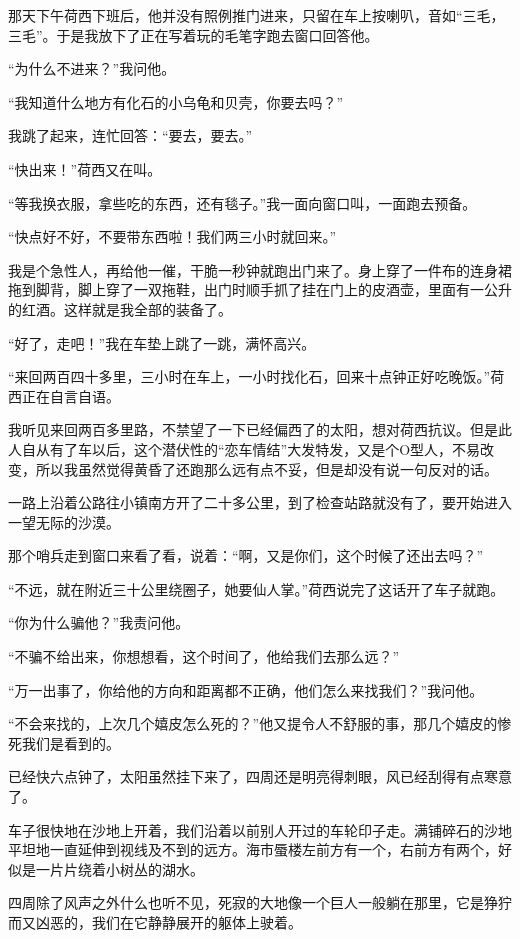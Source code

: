 \par 那天下午荷西下班后，他并没有照例推门进来，只留在车上按喇叭，音如“三毛，三毛”。于是我放下了正在写着玩的毛笔字跑去窗口回答他。
\par “为什么不进来？”我问他。
\par “我知道什么地方有化石的小乌龟和贝壳，你要去吗？”
\par 我跳了起来，连忙回答：“要去，要去。”
\par “快出来！”荷西又在叫。
\par “等我换衣服，拿些吃的东西，还有毯子。”我一面向窗口叫，一面跑去预备。
\par “快点好不好，不要带东西啦！我们两三小时就回来。”
\par 我是个急性人，再给他一催，干脆一秒钟就跑出门来了。身上穿了一件布的连身裙拖到脚背，脚上穿了一双拖鞋，出门时顺手抓了挂在门上的皮酒壶，里面有一公升的红酒。这样就是我全部的装备了。
\par “好了，走吧！”我在车垫上跳了一跳，满怀高兴。
\par “来回两百四十多里，三小时在车上，一小时找化石，回来十点钟正好吃晚饭。”荷西正在自言自语。
\par 我听见来回两百多里路，不禁望了一下已经偏西了的太阳，想对荷西抗议。但是此人自从有了车以后，这个潜伏性的“恋车情结”大发特发，又是个O型人，不易改变，所以我虽然觉得黄昏了还跑那么远有点不妥，但是却没有说一句反对的话。
\par 一路上沿着公路往小镇南方开了二十多公里，到了检查站路就没有了，要开始进入一望无际的沙漠。
\par 那个哨兵走到窗口来看了看，说着：“啊，又是你们，这个时候了还出去吗？”
\par “不远，就在附近三十公里绕圈子，她要仙人掌。”荷西说完了这话开了车子就跑。
\par “你为什么骗他？”我责问他。
\par “不骗不给出来，你想想看，这个时间了，他给我们去那么远？”
\par “万一出事了，你给他的方向和距离都不正确，他们怎么来找我们？”我问他。
\par “不会来找的，上次几个嬉皮怎么死的？”他又提令人不舒服的事，那几个嬉皮的惨死我们是看到的。
\par 已经快六点钟了，太阳虽然挂下来了，四周还是明亮得刺眼，风已经刮得有点寒意了。
\par 车子很快地在沙地上开着，我们沿着以前别人开过的车轮印子走。满铺碎石的沙地平坦地一直延伸到视线及不到的远方。海市蜃楼左前方有一个，右前方有两个，好似是一片片绕着小树丛的湖水。
\par 四周除了风声之外什么也听不见，死寂的大地像一个巨人一般躺在那里，它是狰狞而又凶恶的，我们在它静静展开的躯体上驶着。
